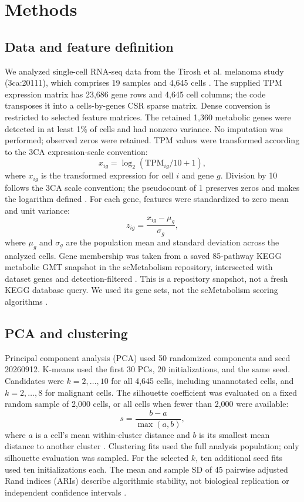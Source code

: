 \section{Methods}

\subsection{Data and feature definition}
We analyzed single-cell RNA-seq data from the Tirosh et al. melanoma study (3ca:20111), which comprises 19 samples and 4,645 cells \cite{Tirosh2016}. The supplied TPM expression matrix has 23,686 gene rows and 4,645 cell columns; the code transposes it into a cells-by-genes CSR sparse matrix. Dense conversion is restricted to selected feature matrices. The retained 1,360 metabolic genes were detected in at least 1\% of cells and had nonzero variance. No imputation was performed; observed zeros were retained. TPM values were transformed according to the 3CA expression-scale convention:
\begin{equation}
x_{ig} = \log_2(\text{TPM}_{ig}/10 + 1),
\end{equation}
where $x_{ig}$ is the transformed expression for cell $i$ and gene $g$. Division by 10 follows the 3CA scale convention; the pseudocount of 1 preserves zeros and makes the logarithm defined \cite{Gavish2023}. For each gene, features were standardized to zero mean and unit variance:
\begin{equation}
z_{ig} = \frac{x_{ig} - \mu_g}{\sigma_g},
\end{equation}
where $\mu_g$ and $\sigma_g$ are the population mean and standard deviation across the analyzed cells. Gene membership was taken from a saved 85-pathway KEGG metabolic GMT snapshot in the scMetabolism repository, intersected with dataset genes and detection-filtered \cite{Kanehisa2023}. This is a repository snapshot, not a fresh KEGG database query. We used its gene sets, not the scMetabolism scoring algorithms \cite{Wu2022}.

\subsection{PCA and clustering}
Principal component analysis (PCA) used 50 randomized components and seed 20260912. K-means used the first 30 PCs, 20 initializations, and the same seed. Candidates were $k=2,\ldots,10$ for all 4,645 cells, including unannotated cells, and $k=2,\ldots,8$ for malignant cells. The silhouette coefficient was evaluated on a fixed random sample of 2,000 cells, or all cells when fewer than 2,000 were available:
\begin{equation}
s = \frac{b - a}{\max(a, b)},
\end{equation}
where $a$ is a cell's mean within-cluster distance and $b$ is its smallest mean distance to another cluster \cite{Rousseeuw1987}. Clustering fits used the full analysis population; only silhouette evaluation was sampled. For the selected $k$, ten additional seed fits used ten initializations each. The mean and sample SD of 45 pairwise adjusted Rand indices (ARIs) describe algorithmic stability, not biological replication or independent confidence intervals \cite{Hubert1985}.
